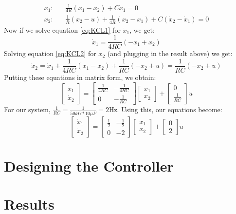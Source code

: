 \documentclass[11pt]{article}
\begin{document}
\begin{align}
x_1:&~~~~ \frac{1}{4R}(x_1-x_2) + C\dot{x}_1 = 0 \label{eq:KCL1} \\ 
x_2:&~~~~ \frac{1}{R}(x_2 - u) + \frac{1}{4R}(x_2-x_1) + C(\dot{x}_2-\dot{x}_1) = 0 \label{eq:KCL2}
\end{align}
%
Now if we solve equation \ref{eq:KCL1} for $\dot{x}_1$, we get:
\begin{equation}
\dot{x}_1 = \frac{1}{4RC}(-x_1+x_2)
\end{equation}
%
Solving equation \ref{eq:KCL2} for $\dot{x}_2$ (and plugging in the result above) we get:
%
\begin{equation}
\dot{x}_2 = \dot{x}_1+\frac{1}{4RC}(x_1-x_2)+\frac{1}{RC}(-x_2+u) =\frac{1}{RC}(-x_2+u)
\end{equation}
%
Putting these equations in matrix form, we obtain:
%
\begin{equation}
\begin{bmatrix}
\dot{x}_1 \\ \dot{x}_2
\end{bmatrix} = 
\begin{bmatrix}
\frac{1}{4RC} & -\frac{1}{4RC} \\
0    & -\frac{1}{RC}
\end{bmatrix}
\begin{bmatrix}
x_1 \\ x_2
\end{bmatrix} + 
\begin{bmatrix}
0 \\ \frac{1}{RC}
\end{bmatrix} u
\end{equation}
%
For our system, $\frac{1}{RC} = \frac{1}{50k\Omega*10\mu F} = 2\mathrm{Hz}$.
Using this, our equations become:
%
\begin{equation}
\begin{bmatrix}
\dot{x}_1 \\ \dot{x}_2
\end{bmatrix} = 
\begin{bmatrix}
\frac{1}{2} & -\frac{1}{2} \\
0    & -2
\end{bmatrix}
\begin{bmatrix}
x_1 \\ x_2
\end{bmatrix} + 
\begin{bmatrix}
0 \\ 2
\end{bmatrix} u
\end{equation}
\section*{Designing the Controller}



\section*{Results}
\end{document}
